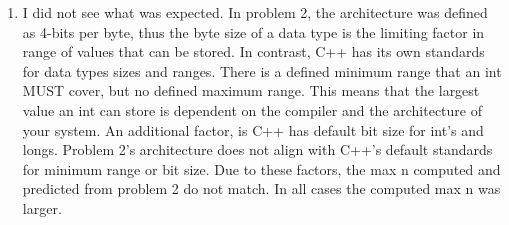 \documentclass[12pt]{exam}
\begin{document}
\begin{enumerate}
 
        
        \item I did not see what was expected. In problem 2, the architecture was defined as 4-bits per byte, thus the byte size of a data type is the limiting factor in range of values that can be stored. In contrast, C++ has its own standards for data types sizes and ranges. There is a defined minimum range that an int MUST cover, but no defined maximum range. This means that the largest value an int can store is dependent on the compiler and the architecture of your system. An additional factor, is C++ has default bit size for int's and longs. Problem 2's architecture does not align with C++'s default standards for minimum range or bit size. Due to these factors, the max n computed and predicted from problem 2 do not match. In all cases the computed max n was larger.

    \end{enumerate}
\end{document}
